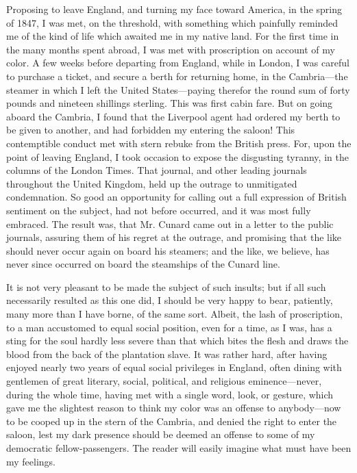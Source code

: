 Proposing to leave England, and turning my face toward America, in the
spring of 1847, I was met, on the threshold, with something which
painfully reminded me of the kind of life which awaited me in my native
land. For the first time in the many months spent abroad, I was met with
proscription on account of my color. A few weeks before departing from
England, while in London, I was careful to purchase a ticket, and secure
a berth for returning home, in the Cambria---the steamer in which I left
the United States---paying therefor the round sum of forty pounds and
nineteen shillings sterling. This was first cabin fare. But on going
aboard the Cambria, I found that the Liverpool agent had ordered my
berth to be given to another, and had forbidden my entering the saloon!
This contemptible conduct met with stern rebuke from the British press.
For, upon the point of leaving England, I took occasion to expose the
disgusting tyranny, in the columns of the London Times. That journal,
and other leading journals throughout the United Kingdom, held up the
outrage to unmitigated condemnation. So good an opportunity for calling
out a full expression of British sentiment on the subject, had not
before occurred, and it was most fully embraced. The result
{\protect\hypertarget{391}{}{}}was, that Mr. Cunard came out in a letter
to the public journals, assuring them of his regret at the outrage, and
promising that the like should never occur again on board his steamers;
and the like, we believe, has never since occurred on board the
steamships of the Cunard line.

It is not very pleasant to be made the subject of such insults; but if
all such necessarily resulted as this one did, I should be very happy to
bear, patiently, many more than I have borne, of the same sort. Albeit,
the lash of proscription, to a man accustomed to equal social position,
even for a time, as I was, has a sting for the soul hardly less severe
than that which bites the flesh and draws the blood from the back of the
plantation slave. It was rather hard, after having enjoyed nearly two
years of equal social privileges in England, often dining with gentlemen
of great literary, social, political, and religious eminence---never,
during the whole time, having met with a single word, look, or gesture,
which gave me the slightest reason to think my color was an offense to
anybody---now to be cooped up in the stern of the Cambria, and denied
the right to enter the saloon, lest my dark presence should be deemed an
offense to some of my democratic fellow-passengers. The reader will
easily imagine what must have been my feelings.

